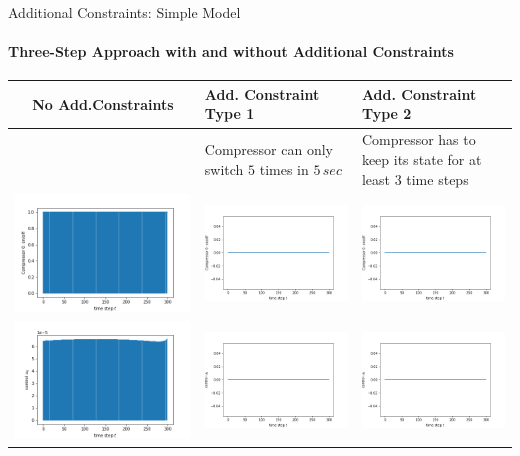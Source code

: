 \documentclass[8pt]{beamer}
\begin{document}
\begin{frame}{Additional Constraints: Simple Model}
\framesubtitle{Three-Step Approach with and without Additional Constraints}
\begin{tabular}{c p{3cm} p{3cm}} \hline
No Add.Constraints & Add. Constraint Type 1& Add. Constraint Type 2 \\\hline
& Compressor can only switch $5$ times in $5 \, sec $& Compressor has to keep its state for at least $3$ time steps \\
\includegraphics[width=.32\textwidth]{images/POCConf.png}  &   \includegraphics[width=.32\textwidth]{images/AC_Simple/POCConf.jpg} & \includegraphics[width=.32\textwidth]{images/AC_Simple/POCConf.jpg}  \\ 
\includegraphics[width=.32\textwidth]{images/POCControl_u.png} &   \includegraphics[width=.32\textwidth]{images/AC_Simple/POCControl_u.jpg}  & \includegraphics[width=.32\textwidth]{images/AC_Simple/POCControl_u.jpg}    \\ 

\end{tabular}
\end{frame}
\end{document}
